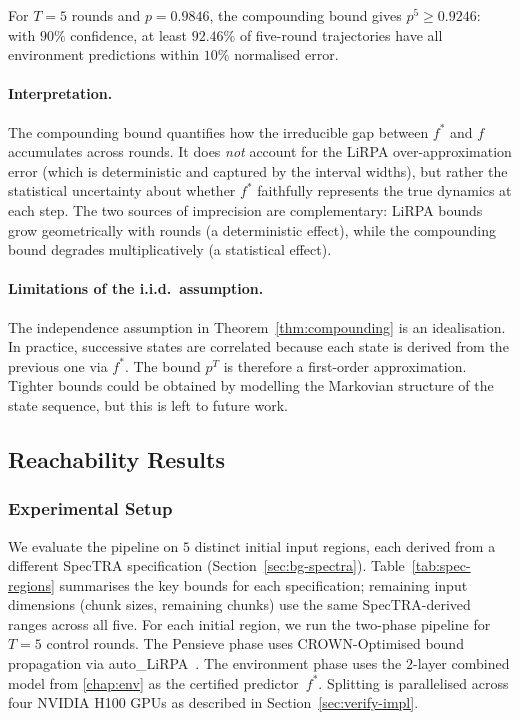 \documentclass[thesis]{uofithesis} %
\begin{document}
    For $T = 5$ rounds and $p = 0.9846$, the compounding bound gives
    $p^5 \geq 0.9246$: with $90\%$ confidence, at least $92.46\%$ of
    five-round trajectories have all environment predictions within
    $10\%$ normalised error.

    \paragraph{Interpretation.}
    The compounding bound quantifies how the irreducible gap between
    $f^{\ast}$ and $f$ accumulates across rounds.  It does \emph{not}
    account for the LiRPA over-approximation error (which is deterministic
    and captured by the interval widths), but rather the statistical
    uncertainty about whether $f^{\ast}$ faithfully represents the true
    dynamics at each step.  The two sources of imprecision are
    complementary: LiRPA bounds grow geometrically with rounds (a
    deterministic effect), while the compounding bound degrades
    multiplicatively (a statistical effect).

    \paragraph{Limitations of the i.i.d.\ assumption.}
    The independence assumption in Theorem~\ref{thm:compounding} is an
    idealisation.  In practice, successive states are correlated because
    each state is derived from the previous one via $f^{\ast}$.  The bound
    $p^T$ is therefore a first-order approximation.  Tighter bounds could be
    obtained by modelling the Markovian structure of the state sequence, but
    this is left to future work.


    \subsection{Reachability Results}
    \label{sec:verify-results}


    \subsubsection{Experimental Setup}
    \label{sec:verify-setup}

    We evaluate the pipeline on $5$ distinct initial input regions, each
    derived from a different SpecTRA specification
    (Section~\ref{sec:bg-spectra}).  Table~\ref{tab:spec-regions}
    summarises the key bounds for each specification; remaining input
    dimensions (chunk sizes, remaining chunks) use the same SpecTRA-derived
    ranges across all five.
    For each initial region, we run the
    two-phase pipeline for $T = 5$ control rounds.  The Pensieve phase uses
    CROWN-Optimised bound propagation via
    auto\_LiRPA~\cite{auto-lirpa}.  The environment phase uses the
    $2$-layer combined model from \ref{chap:env} as the certified
    predictor~$f^{\ast}$.  Splitting is parallelised across four NVIDIA H100
    GPUs as described in Section~\ref{sec:verify-impl}.
\end{document}
